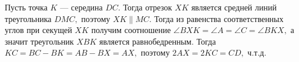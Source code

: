 \documentclass[12pt]{article}
\begin{document}
Пусть точка $K$ --- середина $DC.$ Тогда отрезок $XK$ является средней линий треугольника $DMC,$ поэтому $XK\parallel MC.$ Тогда из равенства соответственных углов при секущей $XK$ получим соотношение $\angle BXK=\angle A=\angle C=\angle BKX,$ а значит треугольник $XBK$ является равнобедренным. Тогда $KC=BC-BK=AB-BX=AX,$ поэтому $2AX=2KC=CD,$ ч.т.д.
\end{document}

